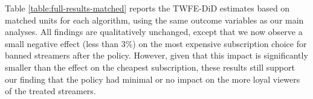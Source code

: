 \documentclass[a4paper,12pt]{article}
\begin{document}
Table \ref{table:full-results-matched} reports the TWFE-DiD estimates based on matched units for each algorithm, using the same outcome variables as our main analyses. All findings are qualitatively unchanged, except that we now observe a small negative effect (less than 3\%) on the most expensive subscription choice for banned streamers after the policy. However, given that this impact is significantly smaller than the effect on the cheapest subscription, these results still support our finding that the policy had minimal or no impact on the more loyal viewers of the treated streamers.
\begin{table}[!htb]
\renewcommand{\arraystretch}{1.2}
\centering
\begin{subtable}{\textwidth}
\caption{PSM Sample}
\label{subtable:psm_results}
\centering
{}
\end{subtable}
\end{table}
\end{document}
